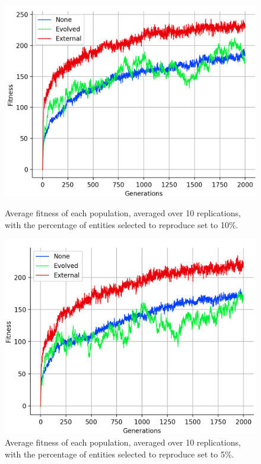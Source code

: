 \documentclass[12pt,a4paper]{report}
\begin{document}
\begin{figure}[t]
   \centering
   \begin{minipage}{0.49\textwidth}
          \centering
          \captionsetup{width=.9\linewidth}
          \includegraphics[width=1.\linewidth]{results/average-keep10.png}
          \caption{Average fitness of each population, averaged over 10 replications, with the percentage of entities selected to reproduce set to 10\%.}
          \label{fig:average-keep10}
   \end{minipage}
   \begin{minipage}{0.49\textwidth}
          \centering
          \captionsetup{width=.9\linewidth}
          \includegraphics[width=1.\linewidth]{results/average-keep05.png}
          \caption{Average fitness of each population, averaged over 10 replications, with the percentage of entities selected to reproduce set to 5\%.}
          \label{fig:average-keep05}
   \end{minipage}
\end{figure}
\end{document}
